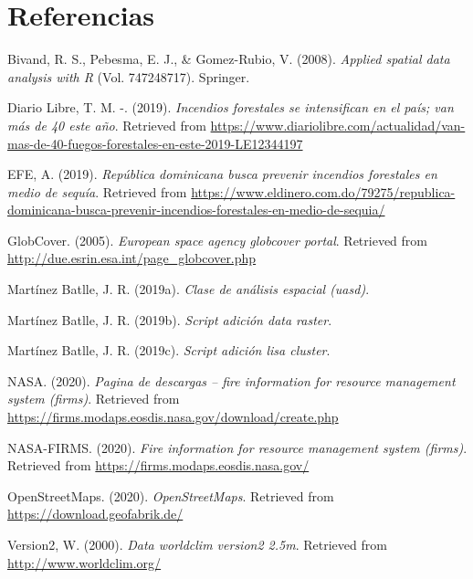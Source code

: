 \documentclass[11pt,]{article}
\begin{document}
\section*{Referencias}\label{referencias}

\hypertarget{refs}{}
\hypertarget{ref-bivand2008applied}{}
Bivand, R. S., Pebesma, E. J., \& Gomez-Rubio, V. (2008). \emph{Applied
spatial data analysis with R} (Vol. 747248717). Springer.

\hypertarget{ref-diariolibre}{}
Diario Libre, T. M. -. (2019). \emph{Incendios forestales se
intensifican en el país; van más de 40 este año}. Retrieved from
\url{https://www.diariolibre.com/actualidad/van-mas-de-40-fuegos-forestales-en-este-2019-LE12344197}

\hypertarget{ref-eldinero}{}
EFE, A. (2019). \emph{República dominicana busca prevenir incendios
forestales en medio de sequía}. Retrieved from
\url{https://www.eldinero.com.do/79275/republica-dominicana-busca-prevenir-incendios-forestales-en-medio-de-sequia/}

\hypertarget{ref-globcover}{}
GlobCover. (2005). \emph{European space agency globcover portal}.
Retrieved from \url{http://due.esrin.esa.int/page_globcover.php}

\hypertarget{ref-profesorClase}{}
Martínez Batlle, J. R. (2019a). \emph{Clase de análisis espacial
(uasd)}.

\hypertarget{ref-profesorData}{}
Martínez Batlle, J. R. (2019b). \emph{Script adición data raster}.

\hypertarget{ref-profesorLisa}{}
Martínez Batlle, J. R. (2019c). \emph{Script adición lisa cluster}.

\hypertarget{ref-firmsdw}{}
NASA. (2020). \emph{Pagina de descargas -- fire information for resource
management system (firms)}. Retrieved from
\url{https://firms.modaps.eosdis.nasa.gov/download/create.php}

\hypertarget{ref-firmsweb}{}
NASA-FIRMS. (2020). \emph{Fire information for resource management
system (firms)}. Retrieved from
\url{https://firms.modaps.eosdis.nasa.gov/}

\hypertarget{ref-OSM}{}
OpenStreetMaps. (2020). \emph{OpenStreetMaps}. Retrieved from
\url{https://download.geofabrik.de/}

\hypertarget{ref-worldclim}{}
Version2, W. (2000). \emph{Data worldclim version2 2.5m}. Retrieved from
\url{http://www.worldclim.org/}




\newpage
\singlespacing 
\end{document}
